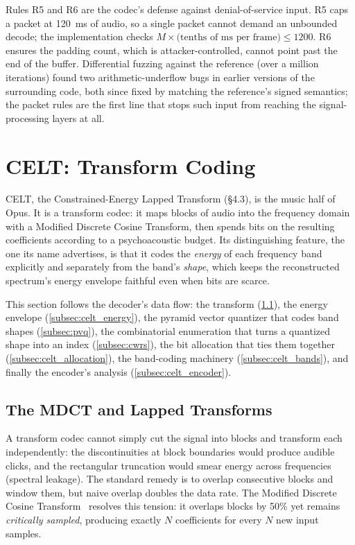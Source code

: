 \begin{importantnote}
  Rules R5 and R6 are the codec's defense against denial-of-service input. R5
  caps a packet at 120~ms of audio, so a single packet cannot demand an
  unbounded decode; the implementation checks $M \times \text{(tenths of ms per
  frame)} \le 1200$. R6 ensures the padding count, which is attacker-controlled,
  cannot point past the end of the buffer. Differential fuzzing against the
  reference (over a million iterations) found two arithmetic-underflow bugs in
  earlier versions of the surrounding code, both since fixed by matching the
  reference's signed semantics; the packet rules are the first line that stops
  such input from reaching the signal-processing layers at all.
\end{importantnote}

\section{CELT: Transform Coding}\label{sec:celt}

CELT, the Constrained-Energy Lapped Transform (\S4.3), is the music half of
Opus. It is a transform codec: it maps blocks of audio into the frequency domain
with a Modified Discrete Cosine Transform, then spends bits on the resulting
coefficients according to a psychoacoustic budget. Its distinguishing feature,
the one its name advertises, is that it codes the \emph{energy} of each frequency
band explicitly and separately from the band's \emph{shape}, which keeps the
reconstructed spectrum's energy envelope faithful even when bits are scarce.

This section follows the decoder's data flow: the transform
(\cref{subsec:mdct}), the energy envelope (\cref{subsec:celt_energy}), the
pyramid vector quantizer that codes band shapes (\cref{subsec:pvq}), the
combinatorial enumeration that turns a quantized shape into an index
(\cref{subsec:cwrs}), the bit allocation that ties them together
(\cref{subsec:celt_allocation}), the band-coding machinery
(\cref{subsec:celt_bands}), and finally the encoder's analysis
(\cref{subsec:celt_encoder}).

\subsection{The MDCT and Lapped Transforms}\label{subsec:mdct}

A transform codec cannot simply cut the signal into blocks and transform each
independently: the discontinuities at block boundaries would produce audible
clicks, and the rectangular truncation would smear energy across frequencies
(spectral leakage). The standard remedy is to overlap consecutive blocks and
window them, but naive overlap doubles the data rate. The Modified Discrete
Cosine Transform~\cite{princen1986analysis,princen1987subband} resolves this
tension: it overlaps blocks by 50\% yet remains \emph{critically sampled},
producing exactly $N$ coefficients for every $N$ new input samples.


